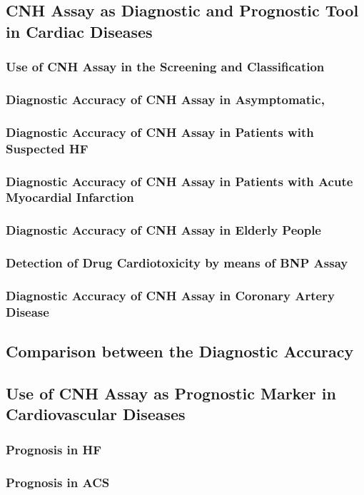 {{{{{{{{{\subsection{ CNH Assay as Diagnostic and Prognostic Tool in Cardiac Diseases}
\subsubsection{ Use of CNH Assay in the Screening and Classification}
\subsubsection{ Diagnostic Accuracy of CNH Assay in Asymptomatic,}
\subsubsection{ Diagnostic Accuracy of CNH Assay in Patients with Suspected HF}
\subsubsection{ Diagnostic Accuracy of CNH Assay in Patients with Acute Myocardial Infarction}
\subsubsection{ Diagnostic Accuracy of CNH Assay in Elderly People}
\subsubsection{ Detection of Drug Cardiotoxicity by means of BNP Assay}
\subsubsection{ Diagnostic Accuracy of CNH Assay in Coronary Artery Disease}
\subsection{ Comparison between the Diagnostic Accuracy}
\subsection{ Use of CNH Assay as Prognostic Marker in Cardiovascular Diseases}
\subsubsection{ Prognosis in HF}
\subsubsection{ Prognosis in ACS}
}}}}}}}}}
